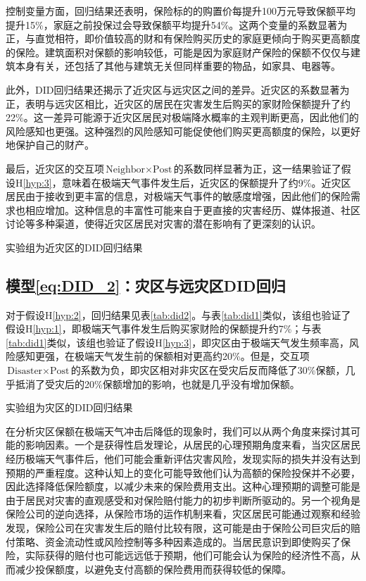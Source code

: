 控制变量方面，回归结果还表明，保险标的的购置价每提升100万元导致保额平均提升15\%，家庭之前投保过会导致保额平均提升54\%。这两个变量的系数显著为正，与直觉相符，即价值较高的财和有保险购买历史的家庭更倾向于购买更高额度的保险。建筑面积对保额的影响较低，可能是因为家庭财产保险的保额不仅仅与建筑本身有关，还包括了其他与建筑无关但同样重要的物品，如家具、电器等。

此外，DID回归结果还揭示了近灾区与远灾区之间的差异。近灾区的系数显著为正，表明与远灾区相比，近灾区的居民在灾害发生后购买的家财险保额提升了约22\%。这一差异可能源于近灾区居民对极端降水概率的主观判断更高，因此他们的风险感知也更强。这种强烈的风险感知可能促使他们购买更高额度的保险，以更好地保护自己的财产。

最后，近灾区的交互项$\text{Neighbor}\times \text{Post}$的系数同样显著为正，这一结果验证了假设H\ref{hyp:3}，意味着在极端天气事件发生后，近灾区的保额提升了约9\%。近灾区居民由于接收到更丰富的信息，对极端天气事件的敏感度增强，因此他们的保险需求也相应增加。这种信息的丰富性可能来自于更直接的灾害经历、媒体报道、社区讨论等多种渠道，使得近灾区居民对灾害的潜在影响有了更深刻的认识。

\begin{table}[htbp]
    \centering
    \caption{实验组为近灾区的DID回归结果}\label{tab:did1}
    
\end{table}

\subsection{模型\ref{eq:DID_2}：灾区与远灾区DID回归}
对于假设H\ref{hyp:2}，回归结果见表\ref{tab:did2}。与表\ref{tab:did1}类似，该组也验证了假设H\ref{hyp:1}，即极端天气事件发生后购买家财险的保额提升约7\%；与表\ref{tab:did1}类似，该组也验证了假设H\ref{hyp:3}，即灾区由于极端天气发生频率高，风险感知更强，在极端天气发生前的保额相对更高约20\%。但是，交互项$\text{Disaster}\times \text{Post}$的系数为负，即灾区相对非灾区在受灾后反而降低了30\%保额，几乎抵消了受灾后的20\%保额增加的影响，也就是几乎没有增加保额。
\begin{table}[htbp]
    \centering
    \caption{实验组为灾区的DID回归结果}\label{tab:did2}
    
\end{table}

在分析灾区保额在极端天气冲击后降低的现象时，我们可以从两个角度来探讨其可能的影响因素。一个是获得性启发理论\citep{0Do}，从居民的心理预期角度来看，当灾区居民经历极端天气事件后，他们可能会重新评估灾害风险，发现实际的损失并没有达到预期的严重程度。这种认知上的变化可能导致他们认为高额的保险投保并不必要，因此选择降低保险额度，以减少未来的保险费用支出。这种心理预期的调整可能是由于居民对灾害的直观感受和对保险赔付能力的初步判断所驱动的。另一个视角是保险公司的逆向选择，从保险市场的运作机制来看，灾区居民可能通过观察和经验发现，保险公司在灾害发生后的赔付比较有限，这可能是由于保险公司巨灾后的赔付策略、资金流动性或风险控制等多种因素造成的\citep{田玲2009中国财产保险业巨灾损失赔付能力实证研究}。当居民意识到即使购买了保险，实际获得的赔付也可能远远低于预期，他们可能会认为保险的经济性不高，从而减少投保额度，以避免支付高额的保险费用而获得较低的保障。

